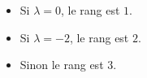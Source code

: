 \begin{itemize}
 \item Si $\lambda=0$, le rang est $1$.
 \item Si $\lambda=-2$, le rang est $2$.
 \item Sinon le rang est $3$.
\end{itemize}
